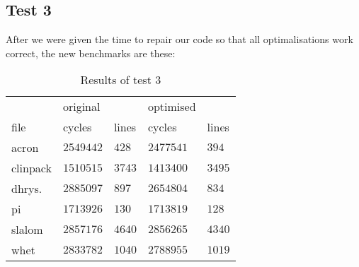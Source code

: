 \subsection{Test 3}
After we were given the time to repair our code so that all optimalisations work
correct, the new benchmarks are these:

\begin{table}[ht]
\centering
\begin{tabular}{l l l l l}
\toprule
         &original      &            &optimised    &             \\
file     &cycles        &lines       &cycles       &lines\\
\midrule
acron    &$ 2549442 $   &$ 428 $     &$ 2477541 $  &$ 394 $             \\
clinpack &$ 1510515 $   &$ 3743 $    &$ 1413400 $  &$ 3495 $             \\
dhrys.   &$ 2885097 $   &$ 897 $     &$ 2654804 $  &$ 834 $             \\
pi       &$ 1713926 $   &$ 130 $     &$ 1713819 $  &$ 128 $             \\
slalom   &$ 2857176 $   &$ 4640 $    &$ 2856265 $  &$ 4340 $             \\
whet     &$ 2833782 $   &$ 1040 $    &$ 2788955 $  &$ 1019 $             \\
\bottomrule
\end{tabular}
\caption{Results of test 3}
\label{tab:test3}
\end{table}
